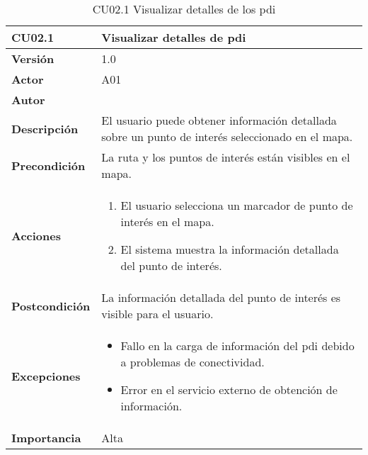 \begin{table}[p]
	\centering
	\begin{tabularx}{\linewidth}{ p{} p{} }
		\toprule
		\textbf{CU02.1}    & \textbf{Visualizar detalles de \acrfull{pdi}} \\
		\toprule
		\textbf{Versión}              & 1.0    \\
		\textbf{Actor}                & A01 \\
		\textbf{Autor}                & \autor \\
		\textbf{Descripción}          & El usuario puede obtener información detallada sobre un punto de interés seleccionado en el mapa. \\
		\textbf{Precondición}         & La ruta y los puntos de interés están visibles en el mapa. \\
		\textbf{Acciones}             &
		\begin{enumerate}
			\def\labelenumi{\arabic{enumi}.}
			\tightlist
			\item El usuario selecciona un marcador de punto de interés en el mapa.
			\item El sistema muestra la información detallada del punto de interés.
		\end{enumerate}\\
		\textbf{Postcondición}        & La información detallada del punto de interés es visible para el usuario. \\
		\textbf{Excepciones}          & 
		\begin{itemize}
			\tightlist
			\item Fallo en la carga de información del \acrlong{pdi} debido a problemas de conectividad.
			\item Error en el servicio externo de obtención de información.
		\end{itemize}\\
		\textbf{Importancia}          & Alta \\
		\bottomrule
	\end{tabularx}
	\caption{CU02.1 Visualizar detalles de los \acrfull{pdi}}
\end{table}

